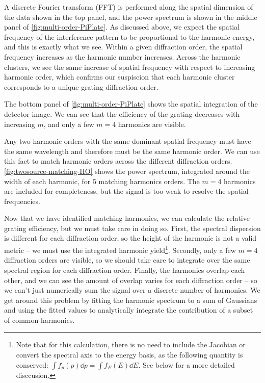 A discrete Fourier transform (FFT) is performed along the spatial dimension of the data shown in the top panel, and the power spectrum is shown in the middle panel of \cref{fig:multi-order-PiPlate}. As discussed above, we expect the spatial frequency of the interference pattern to be proportional to the harmonic energy, and this is exactly what we see. Within a given diffraction order, the spatial frequency increases as the harmonic number increases. Across the harmonic clusters, we see the same increase of spatial frequency with respect to increasing harmonic order, which confirms our suspiscion that each harmonic cluster corresponds to a unique grating diffraction order.

The bottom panel of \cref{fig:multi-order-PiPlate} shows the spatial integration of the detector image. We can see that the efficiency of the grating decreases with increasing $m$, and only a few $m=4$ harmonics are visible.

Any two harmonic orders with the same dominant spatial frequency must have the same wavelength and therefore must be the same harmonic order. We can use this fact to match harmonic orders across the different diffraction orders. \cref{fig:twosource-matching-HO} shows the power spectrum, integrated around the width of each harmonic, for 5 matching harmonics orders. The $m=4$ harmonics are included for completeness, but the signal is too weak to resolve the spatial frequencies.

Now that we have identified matching harmonics, we can calculate the relative grating efficiency, but we must take care in doing so. First, the spectral dispersion is different for each diffraction order, so the height of the harmonic is not a valid metric -- we must use the integrated harmonic yield\footnote{Note that for this calculation, there is no need to include the Jacobian or convert the spectral axis to the energy basis, as the following quantity is conserved: $\int f_p(p) \dd{p} = \int f_E(E) \dd{E}$. See below for a more detailed disccusion.}. Secondly, only a few $m=4$ diffraction orders are visible, so we should take care to integrate over the same spectral region for each diffraction order. Finally, the harmonics overlap each other, and we can see the amount of overlap varies for each diffraction order -- so we can't just numerically sum the signal over a discrete number of harmonics. We get around this problem by fitting the harmonic spectrum to a sum of Gaussians and using the fitted values to analytically integrate the contribution of a subset of common harmonics.

